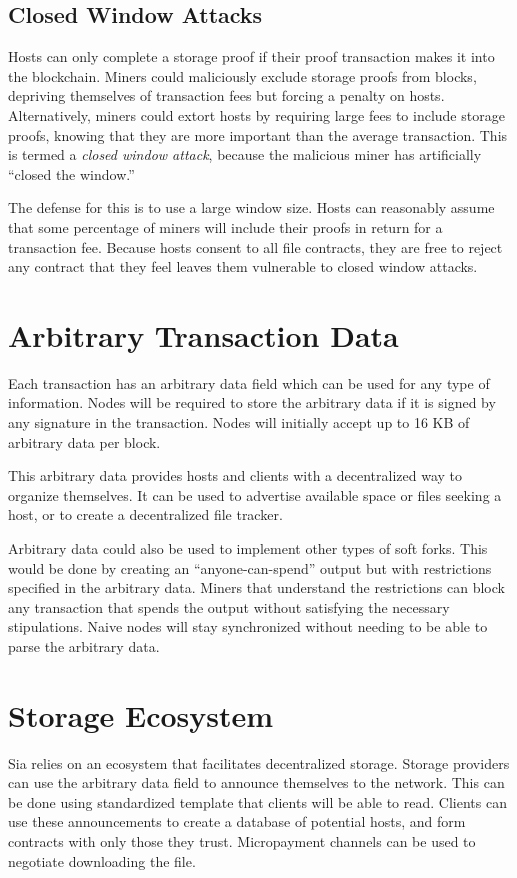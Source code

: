 \documentclass[twocolumn]{article}
\begin{document}
\subsection{Closed Window Attacks}
Hosts can only complete a storage proof if their proof transaction makes it into the blockchain.
Miners could maliciously exclude storage proofs from blocks, depriving themselves of transaction fees but forcing a penalty on hosts.
Alternatively, miners could extort hosts by requiring large fees to include storage proofs, knowing that they are more important than the average transaction.
This is termed a \textit{closed window attack}, because the malicious miner has artificially ``closed the window.''

The defense for this is to use a large window size.
Hosts can reasonably assume that some percentage of miners will include their proofs in return for a transaction fee.
Because hosts consent to all file contracts, they are free to reject any contract that they feel leaves them vulnerable to closed window attacks.

\section{Arbitrary Transaction Data}
Each transaction has an arbitrary data field which can be used for any type of information.
Nodes will be required to store the arbitrary data if it is signed by any signature in the transaction.
Nodes will initially accept up to 16 KB of arbitrary data per block.

This arbitrary data provides hosts and clients with a decentralized way to organize themselves.
It can be used to advertise available space or files seeking a host, or to create a decentralized file tracker.

Arbitrary data could also be used to implement other types of soft forks.
This would be done by creating an ``anyone-can-spend'' output but with restrictions specified in the arbitrary data.
Miners that understand the restrictions can block any transaction that spends the output without satisfying the necessary stipulations.
Naive nodes will stay synchronized without needing to be able to parse the arbitrary data.

\section{Storage Ecosystem}
Sia relies on an ecosystem that facilitates decentralized storage.
Storage providers can use the arbitrary data field to announce themselves to the network.
This can be done using standardized template that clients will be able to read.
Clients can use these announcements to create a database of potential hosts, and form contracts with only those they trust.
Micropayment channels \cite{mpc} can be used to negotiate downloading the file. %
\end{document}
